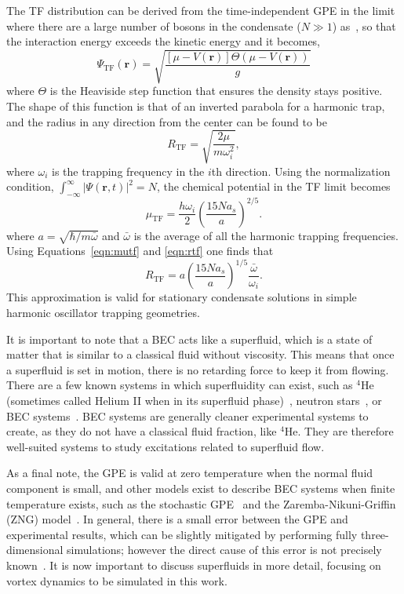 The TF distribution can be derived from the time-independent GPE in the limit where there are a large number of bosons in the condensate ($N \gg 1$) as~\cite{ueda2010}, so that the interaction energy exceeds the kinetic energy and it becomes, 
\begin{equation}
\Psi_\text{TF}(\mathbf{r}) = \sqrt{\frac{[\mu-V(\mathbf{r})]\Theta(\mu-V(\mathbf{r}))}{g}}
\end{equation}
\noindent where $\Theta$ is the Heaviside step function that ensures the density stays positive.
The shape of this function is that of an inverted parabola for a harmonic trap, and the radius in any direction from the center can be found to be
\begin{equation}
R_\text{TF} = \sqrt{\frac{2\mu}{m\omega_i^2}},
\label{eqn:rtf}
\end{equation}
\noindent where $\omega_i$ is the trapping frequency in the $i$th direction.
Using the normalization condition, $\int_{-\infty}^\infty |\Psi(\mathbf{r},t)|^2 = N$, the chemical potential in the TF limit becomes
\begin{equation}
\mu_\text{TF} = \frac{h\omega_i}{2}\left(\frac{15 N a_s}{a} \right)^{2/5}.
\label{eqn:mutf}
\end{equation}
\noindent where $a=\sqrt{\hbar/m\bar\omega}$ and $\bar \omega$ is the average of all the harmonic trapping frequencies.
Using Equations~\eqref{eqn:mutf} and \eqref{eqn:rtf} one finds that
\begin{equation}
R_\text{TF} = a\left(\frac{15 N a_s}{a} \right)^{1/5}\frac{\bar \omega}{\omega_i}.
\end{equation}
This approximation is valid for stationary condensate solutions in simple harmonic oscillator trapping geometries.

It is important to note that a BEC acts like a superfluid, which is a state of matter that is similar to a classical fluid without viscosity.
This means that once a superfluid is set in motion, there is no retarding force to keep it from flowing.
There are a few known systems in which superfluidity can exist, such as $^4$He (sometimes called Helium II when in its superfluid phase)~\cite{allen1938}, neutron stars~\cite{migdal1960}, or BEC systems~\cite{einstein1925, anderson1995}.
BEC systems are generally cleaner experimental systems to create, as they do not have a classical fluid fraction, like $^4$He.
They are therefore well-suited systems to study excitations related to superfluid flow.

As a final note, the GPE is valid at zero temperature when the normal fluid component is small, and other models exist to describe BEC systems when finite temperature exists, such as the stochastic GPE~\cite{rooney2012} and the Zaremba-Nikuni-Griffin (ZNG) model~\cite{zaremba1999}.
In general, there is a small error between the GPE and experimental results, which can be slightly mitigated by performing fully three-dimensional simulations; however the direct cause of this error is not precisely known~\cite{savage2003}.
It is now important to discuss superfluids in more detail, focusing on vortex dynamics to be simulated in this work.

